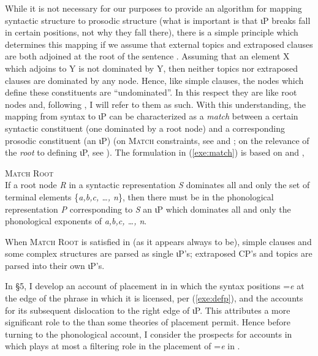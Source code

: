 \documentclass[output=paper,
modfonts
]{LSP/langsci}
\begin{document}
While it is not necessary for our purposes to provide an algorithm for mapping syntactic structure to
prosodic structure (what is important is that  ιP breaks fall in certain positions, not why they fall there), there is a simple
principle which determines this mapping if we assume that external topics and extraposed clauses are both adjoined at the root
of the sentence \citep{aissen1992}.
 Assuming that an element X which adjoins to Y is not dominated by Y, then neither topics nor extraposed clauses are dominated by any node. Hence, like simple clauses, the nodes which define these constituents are ``undominated''. In this respect they are like root nodes
 and, following \citet{frank2002ais}, I will refer to them as such.
With this understanding, the mapping from syntax to ιP can be characterized as a \emph{match} between a certain syntactic constituent (one dominated by a root node) 
and a corresponding prosodic constituent (an ιP) (on \textsc{Match} constraints, see \citealt{selkirk2009} and \citealt{elfner2012};  on the relevance of the \emph{root} to defining ιP, see \citealt{downing1970, nesporvogel1986, selkirk2009}). The formulation in (\ref{exe:match}) is based on \citet{bennettetal} and \citet{elfner2012},
\begin{exe}
\ex
\textsc{Match Root} \\
If a root node \emph{R} in a syntactic representation \emph{S} dominates all and only the set of terminal elements \{\emph{a,b,c, \dots, n}\}, 
then there must be in the phonological representation \emph{P} corresponding to \emph{S} an ιP which dominates all and only
 the phonological exponents of \emph{a,b,c, \dots, n}.
\label{exe:match}
\end{exe}
When \textsc{Match Root} is satisfied in  (as it appears always to be), 
simple clauses and some complex structures are parsed as single ιP's; extraposed CP's and topics are  parsed into their own ιP's.  

In \S5, I develop an account of  placement in  in which the syntax positions =\emph{e} at the edge of the phrase in which
it is licensed, per (\ref{exe:defp}), and the  accounts for its subsequent dislocation to the right edge of ιP.  This attributes
a more significant role to the  than some theories of  placement permit.
Hence before turning to the phonological account,
I consider the prospects for accounts in which  plays at most a filtering role in the placement of =\emph{e} in .
\end{document}

